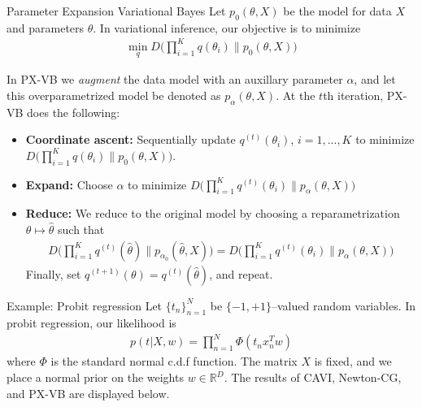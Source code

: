 \documentclass[final]{beamer}
\newlength{\twocolwid}
\begin{document}
\begin{frame}[t]
\begin{columns}[t]
\begin{column}{\twocolwid}


\begin{block}{Parameter Expansion Variational Bayes}
Let $p_0(\theta, X)$ be the model for data $X$ and parameters $\theta$. In variational inference, our objective is to minimize
\begin{align*}
\min_q D\Big( \prod_{i=1}^K q(\theta_i) \| p_0(\theta, X) \Big)
\end{align*}

In PX-VB we {\itshape augment} the data model with an auxillary parameter $\alpha$, and let this overparametrized model be denoted as $p_\alpha(\theta, X)$. At the $t$th iteration, PX-VB does the following: 
\begin{itemize}
\item {\bf Coordinate ascent: } Sequentially update $q^{(t)}(\theta_i)$, $i=1,...,K$ to minimize $D\big( \prod_{i=1}^K q(\theta_i) \| p_0(\theta, X) \big)$. 
\item {\bf Expand: } Choose $\alpha$ to minimize $D\big( \prod_{i=1}^K q^{(t)}(\theta_i) \| p_\alpha(\theta, X) \big)$
\item {\bf Reduce: } We reduce to the original model by choosing a reparametrization $\theta \mapsto \hat\theta$ such that
\begin{align*}
D\Big( \prod_{i=1}^K q^{(t)}(\hat\theta) \| p_{\alpha_0}(\hat\theta, X) \big) = D\big( \prod_{i=1}^K q^{(t)}(\theta_i) \| p_\alpha(\theta, X) \Big)
\end{align*}
Finally, set $q^{(t+1)}(\theta) = q^{(t)}(\hat\theta)$, and repeat. 
\end{itemize}
\end{block}

\vspace{-1em}

\begin{block}{Example: Probit regression}
Let $\{t_n\}_{n=1}^N$ be $\{-1,+1\}$--valued random variables. In probit regression, our likelihood is
\begin{align*}
p(t | X, w) = \prod_{n=1}^N \Phi(t_nx_n^Tw)
\end{align*}
where $\Phi$ is the standard normal c.d.f function. The matrix $X$ is fixed, and we place a normal prior on the weights $w\in\mathbb R^D$. The results of CAVI, Newton-CG, and PX-VB are displayed below.   \\ %




\end{block}
\end{column}
\end{columns}
\end{frame}
\end{document}
